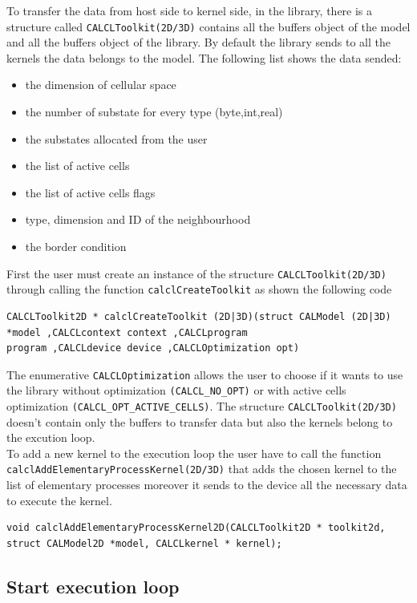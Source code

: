 To transfer the data from host side to kernel side, in the library, there is
a structure called \verb'CALCLToolkit(2D/3D)' contains all the buffers object of the
model and all the buffers object of the library. 
By default the library sends to all the kernels the data belongs to the model. The following list shows the
data sended:
\begin{itemize}
	\item the dimension of cellular space 
	\item the number of substate for every type (byte,int,real) 
	\item the substates allocated from the user
	\item the list of active cells
	\item the list of active cells flags
	\item type, dimension and ID of the neighbourhood
	\item the border condition
\end{itemize}


 First the user must create an
instance of the structure \verb'CALCLToolkit(2D/3D)' through calling the function
\verb'calclCreateToolkit' as shown the following code
\begin{lstlisting}
CALCLToolkit2D * calclCreateToolkit (2D|3D)(struct CALModel (2D|3D) *model ,CALCLcontext context ,CALCLprogram
program ,CALCLdevice device ,CALCLOptimization opt)
\end{lstlisting}
The enumerative \verb'CALCLOptimization' allows the user to choose if it wants to use
the library without optimization \verb|(CALCL_NO_OPT)| or with active cells optimization
 \verb|(CALCL_OPT_ACTIVE_CELLS)|. The structure \verb'CALCLToolkit(2D/3D)'
doesn't contain only the buffers to transfer data but also the kernels belong to the
excution loop. \\
To add a new kernel to the execution loop the user have to call the function \verb'calclAddElementaryProcessKernel(2D/3D)' that
adds the chosen kernel to the list of elementary processes moreover it sends to
the device all the necessary data to execute the kernel.

\begin{lstlisting}
void calclAddElementaryProcessKernel2D(CALCLToolkit2D * toolkit2d, struct CALModel2D *model, CALCLkernel * kernel);
\end{lstlisting}


\subsection{Start execution loop}

